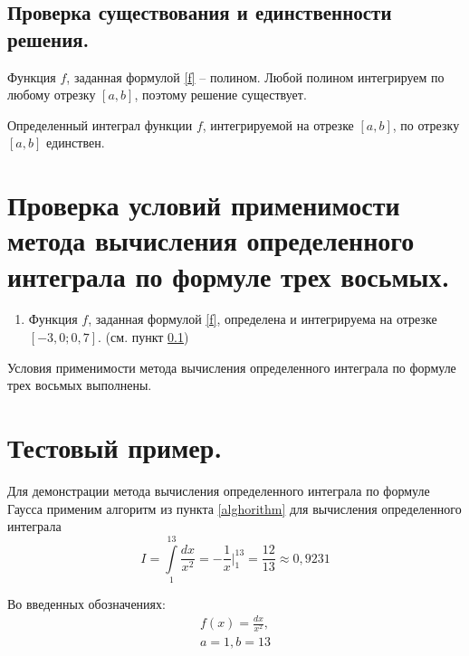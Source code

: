 \documentclass[a4paper, 12pt]{article}
\begin{document}
	\subsection{Проверка существования и единственности решения.}
	\label{solexistance}
	
	Функция $f$, заданная формулой \eqref{f} -- полином. Любой полином интегрируем по любому отрезку $[a,b]$, поэтому решение существует.
	
	Определенный интеграл функции $f$, интегрируемой на отрезке $[a,b]$, по отрезку $[a,b]$ единствен.
	
	\section{Проверка условий применимости метода вычисления определенного интеграла по формуле трех восьмых.}
	
	\begin{enumerate}
		\item Функция $f$, заданная формулой \eqref{f}, определена и интегрируема на отрезке $[-3,0;0,7]$. (см. пункт \ref{solexistance})
	\end{enumerate}
	
	Условия применимости метода вычисления определенного интеграла по формуле трех восьмых выполнены.
	
	\section{Тестовый пример.}
	
	Для демонстрации метода вычисления определенного интеграла по формуле Гаусса применим алгоритм из пункта \ref{alghorithm} для вычисления определенного интеграла
	\begin{equation}
		I=\int\limits_1^{13}\frac{dx}{x^2}=-\frac{1}{x}\bigg|_1^{13}=\frac{12}{13}\approx0,9231
	\end{equation}

	Во введенных обозначениях:
	\begin{equation*}
		\begin{gathered}
		f(x)=\frac{dx}{x^2},\\
		a=1, b=13
		\end{gathered}
	\end{equation*}
	
\end{document}
